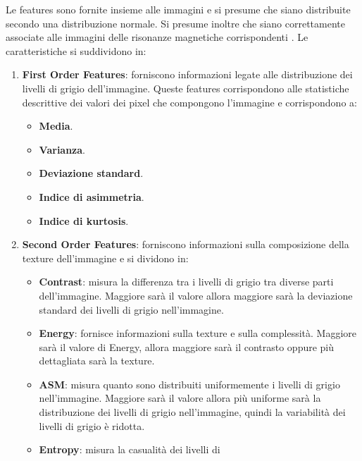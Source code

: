 Le features sono fornite insieme alle immagini e si presume che siano distribuite
secondo una distribuzione normale. Si presume inoltre che siano correttamente
associate alle immagini delle risonanze magnetiche corrispondenti \cite{explanation-features}.
Le caratteristiche si suddividono in:
\begin{enumerate}
      \item \textbf{First Order Features}: forniscono informazioni legate alle
            distribuzione dei livelli di grigio dell'immagine. Queste features
            corrispondono alle statistiche descrittive dei valori dei pixel
            che compongono l'immagine e corrispondono a:
            \begin{itemize}
                  \item \textbf{Media}.
                  \item \textbf{Varianza}.
                  \item \textbf{Deviazione standard}.
                  \item \textbf{Indice di asimmetria}.
                  \item \textbf{Indice di kurtosis}.
            \end{itemize}
      \item \textbf{Second Order Features}: forniscono informazioni sulla
            composizione della texture dell'immagine e si dividono in:
            \begin{itemize}
                  \item \textbf{Contrast}: misura la differenza tra i livelli di
                        grigio tra diverse parti dell'immagine. Maggiore sarà il
                        valore allora maggiore sarà la deviazione standard dei
                        livelli di grigio nell'immagine.
                  \item \textbf{Energy}: fornisce informazioni sulla texture e
                        sulla complessità. Maggiore sarà il valore di Energy,
                        allora maggiore sarà il contrasto oppure più dettagliata
                        sarà la texture.
                  \item \textbf{ASM}: misura quanto sono distribuiti uniformemente
                        i livelli di grigio nell'immagine. Maggiore sarà il valore
                        allora più uniforme sarà la distribuzione dei livelli di
                        grigio nell'immagine, quindi la variabilità dei livelli
                        di grigio è ridotta.
                  \item \textbf{Entropy}: misura la casualità dei livelli di

\end{itemize}
\end{enumerate}
